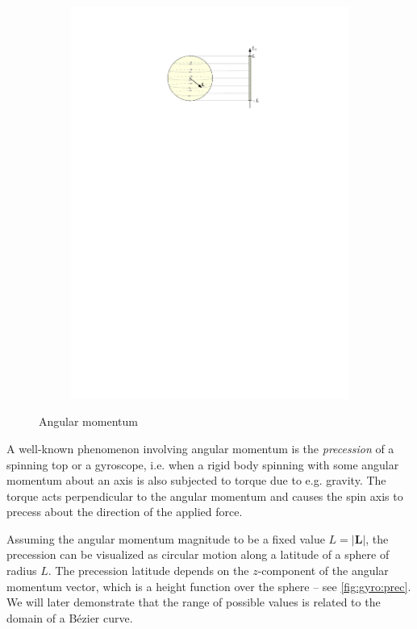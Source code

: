 \documentclass[12pt,final,3p]{elsarticle}
\begin{document}
\begin{figure}[h]
\begin{subfigure}{0.32\textwidth}
		\includegraphics[width=\textwidth, keepaspectratio]{figures/momentmap_S2_v3.pdf}
		\label{fig:gyro:prec}
	\end{subfigure}
	\caption{Angular momentum}
	\label{fig:gyro}
\end{figure}

A well-known phenomenon involving angular momentum is the \emph{precession} of a spinning top or a gyroscope, i.e. when a rigid body spinning with some angular momentum about an axis is  also subjected to torque due to e.g. gravity. The torque acts perpendicular to the angular momentum and causes the spin axis to precess about the direction of the applied force.

Assuming the angular momentum magnitude to be a fixed value $L = \left| \mathbf{L} \right| $, the precession can be visualized as circular motion along a latitude of a sphere of radius $L$. The precession latitude depends on the $z$-component of the angular momentum vector, which is a height function over the sphere -- see \autoref{fig:gyro:prec}. We will later demonstrate that the range of possible values is related to the domain of a B\'{e}zier curve.
\end{document}
